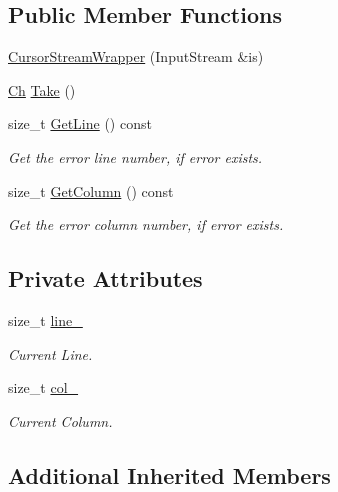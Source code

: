 \subsection*{Public Member Functions}
\begin{DoxyCompactItemize}
\item 
\hyperlink{classCursorStreamWrapper_a8d9a0109e19ab4fb7a79091cefe608a7}{Cursor\+Stream\+Wrapper} (Input\+Stream \&is)
\item 
\hyperlink{classCursorStreamWrapper_a4bab1186bfeebbcf00719c2613b0dca6}{Ch} \hyperlink{classCursorStreamWrapper_af0bbad24ff7ad101cdf9842760deb0f6}{Take} ()
\item 
size\+\_\+t \hyperlink{classCursorStreamWrapper_ad5cc5b06be7fb5afb7c3d4a82b5ef8ce}{Get\+Line} () const
\begin{DoxyCompactList}\small\item\em Get the error line number, if error exists. \end{DoxyCompactList}\item 
size\+\_\+t \hyperlink{classCursorStreamWrapper_afdd243889599c9c9edfacea82674a8f4}{Get\+Column} () const
\begin{DoxyCompactList}\small\item\em Get the error column number, if error exists. \end{DoxyCompactList}\end{DoxyCompactItemize}
\subsection*{Private Attributes}
\begin{DoxyCompactItemize}
\item 
size\+\_\+t \hyperlink{classCursorStreamWrapper_a6f49c4b224ab4210223202696ed1b6b0}{line\+\_\+}
\begin{DoxyCompactList}\small\item\em Current Line. \end{DoxyCompactList}\item 
size\+\_\+t \hyperlink{classCursorStreamWrapper_ac487665a7485024745d82cd0cfa7107d}{col\+\_\+}
\begin{DoxyCompactList}\small\item\em Current Column. \end{DoxyCompactList}\end{DoxyCompactItemize}
\subsection*{Additional Inherited Members}


